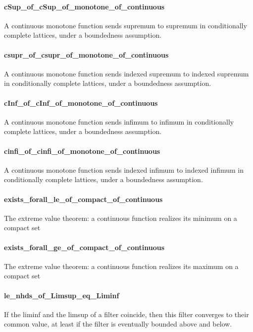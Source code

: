 \documentclass{article}
\begin{document}
\paragraph{cSup\_of\_cSup\_of\_monotone\_of\_continuous}
\par
A continuous monotone function sends supremum to supremum in conditionally complete
lattices, under a boundedness assumption.
\paragraph{csupr\_of\_csupr\_of\_monotone\_of\_continuous}
\par
A continuous monotone function sends indexed supremum to indexed supremum in conditionally complete
lattices, under a boundedness assumption.
\paragraph{cInf\_of\_cInf\_of\_monotone\_of\_continuous}
\par
A continuous monotone function sends infimum to infimum in conditionally complete
lattices, under a boundedness assumption.
\paragraph{cinfi\_of\_cinfi\_of\_monotone\_of\_continuous}
\par
A continuous monotone function sends indexed infimum to indexed infimum in conditionally complete
lattices, under a boundedness assumption.
\paragraph{exists\_forall\_le\_of\_compact\_of\_continuous}
\par
The extreme value theorem: a continuous function realizes its minimum on a compact set
\paragraph{exists\_forall\_ge\_of\_compact\_of\_continuous}
\par
The extreme value theorem: a continuous function realizes its maximum on a compact set
\paragraph{le\_nhds\_of\_Limsup\_eq\_Liminf}
\par
If the liminf and the limsup of a filter coincide, then this filter converges to
their common value, at least if the filter is eventually bounded above and below.
\end{document}
